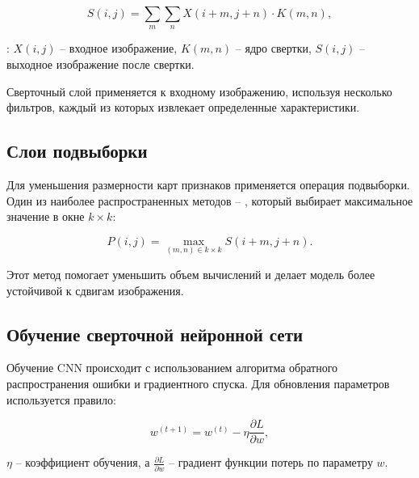 \begin{equation}
    S(i, j) = \sum_{m} \sum_{n} X(i+m, j+n) \cdot K(m, n),
\end{equation}

:
    \( X(i, j) \) – входное изображение,
    \( K(m, n) \) – ядро свертки,
    \( S(i, j) \) – выходное изображение после свертки.

Сверточный слой применяется к входному изображению, используя несколько 
фильтров, каждый из которых извлекает определенные характеристики.

\subsection{Слои подвыборки}
\hspace*{12.5 mm}Для уменьшения размерности карт признаков применяется операция 
подвыборки. Один из наиболее распространенных методов – , 
который выбирает максимальное значение в окне \( k \times k \):

\begin{equation}
    P(i, j) = \max_{(m, n) \in k \times k} S(i+m, j+n).
\end{equation}

Этот метод помогает уменьшить объем вычислений и делает модель более устойчивой
к сдвигам изображения.

\subsection{Обучение сверточной нейронной сети}
\hspace*{12.5 mm}Обучение CNN происходит с использованием алгоритма обратного 
распространения ошибки и градиентного спуска. Для обновления параметров 
используется правило:

\begin{equation}
    w^{(t+1)} = w^{(t)} - \eta \frac{\partial L}{\partial w},
\end{equation}

 \( \eta \) – коэффициент обучения, а \( \frac{\partial L}{\partial w} \) – 
градиент функции потерь по параметру \( w \).


